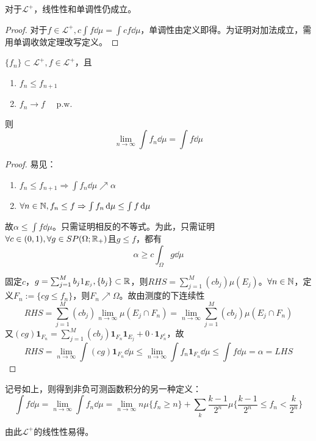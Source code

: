 \documentclass{ctexbook}
\begin{document}
\begin{Prop}
  对于$\mathcal{L}^{+}$，线性性和单调性仍成立。
\end{Prop}
\begin{proof}
对于$f\in \mathcal{L}^{+},c\int f\dd\mu=\int cf\dd\mu$，单调性由定义即得。为证明对加法成立，需用单调收敛定理改写定义。
\end{proof}
\begin{Thm}
  $\{f_{n}\}\subset \mathcal L^{+},f\in\mathcal{L}^{+}$，且
  \begin{enumerate}
  \item $f_{n}\leq f_{n+1}$
  \item $f_{n}\to f\quad \text{ p.w. }$ 
  \end{enumerate}
  则
  \[\lim_{n\to\infty}\int f_{n}\dd\mu=\int f\dd\mu\]
\end{Thm}
\begin{proof}
  易见：
  \begin{enumerate}
  \item $f_{n}\leq f_{n+1}\Rightarrow \int f_{n}\dd\mu\nearrow\alpha$
  \item $\forall n\in\mathbb{N}, f_{n}\leq f\Rightarrow \int f_{n}\,\mathrm{d}\mu\leq \int f\,\mathrm{d}\mu$
  \end{enumerate}
  故$\alpha\leq\int f\dd\mu$。只需证明相反的不等式。为此，只需证明$\forall c\in (0,1),\forall g\in SP(\Omega;\mathbb{R}_{+})$且$g\leq f$，都有
  \[\alpha\geq c\int_{\Omega}g\dd\mu\]

  固定$c$，$g=\sum_{j=1}^{M}b_{j}1_{E_{j}},\{b_{j}\}\subset\mathbb{R}$，则$RHS=\sum_{j=1}^{M}(cb_{j})\mu(E_{j})$。$\forall n\in\mathbb{N}$，定义$F_{n}:=\{cg\leq f_{n}\}$，则$F_{n}\nearrow \Omega$。故由测度的下连续性
  \[RHS=\sum_{j=1}^{M}(cb_{j})\lim_{n\to\infty}\mu(E_{j}\cap F_{n})=\lim_{n\to\infty}\sum_{j=1}^{M}(cb_{j})\mu(E_{j}\cap F_{n})\]
  又$(cg)\bm 1_{F_{n}}=\sum_{j=1}^{M}(cb_{j})\bm 1_{F_{n}}\bm 1_{E_{j}}+ 0\cdot\bm 1_{F_{n}^{c}}$，故
  \[RHS=\lim\limits_{n\to\infty}\int (cg)\bm 1_{F_{n}}\dd\mu\leq \lim\limits_{n\to\infty}\int f_{n}\bm 1_{F_{n}}\dd\mu\leq \int f\dd\mu=\alpha=LHS\]
\end{proof}

\begin{Cor}
  记号如上，则得到非负可测函数积分的另一种定义：
  \[\int f\dd\mu=\lim_{n\to\infty}\int f_{n}\dd\mu=\lim_{n\to\infty}n\mu\{f_{n}\geq n\}+\sum_{k}\frac{k-1}{2^{n}}\mu\{\frac{k-1}{2^{n}}\leq f_{n}<\frac{k}{2^{n}}\}\]
\end{Cor}

由此$\mathcal{L}^{+}$的线性性易得。
\end{document}
